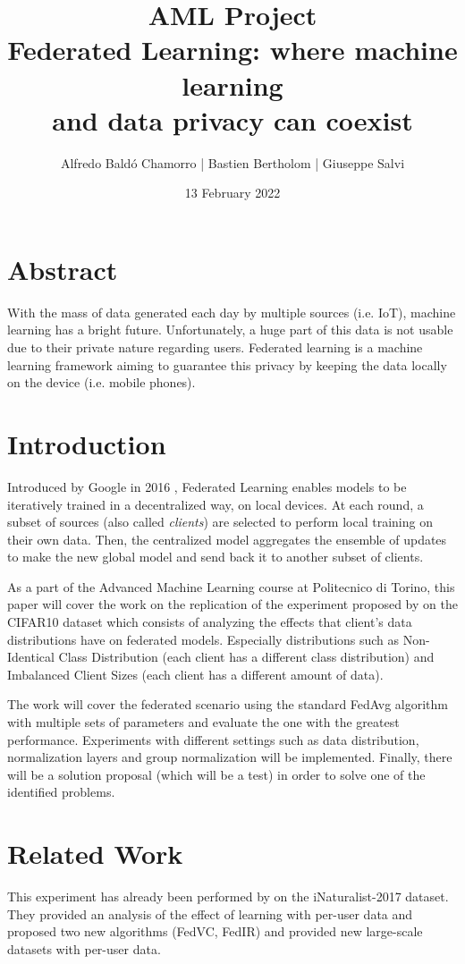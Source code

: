 \documentclass[twocolumn]{article}
\title{\textbf{AML Project}
\\Federated Learning: where machine learning \\and data privacy can coexist
}
\author{
Alfredo Baldó Chamorro | 
Bastien Bertholom |
Giuseppe Salvi
}
\date{13 February 2022}
\begin{document}
\maketitle

\section{Abstract}
With the mass of data generated each day by multiple sources (i.e. IoT), machine learning has a bright future. Unfortunately, a huge part of this data is not usable due to their private nature regarding users. Federated learning is a machine learning framework aiming to guarantee this privacy by keeping the data locally on the device (i.e. mobile phones).
\section{Introduction} %

Introduced by Google in 2016 \cite{DBLP:journals/corr/KonecnyMYRSB16}, Federated Learning enables models to be iteratively trained in a decentralized way, on local devices. At each round, a subset of sources (also called \emph{clients}) are selected to perform local training on their own data. Then, the centralized model aggregates the ensemble of updates to make the new global model and send back it to another subset of clients. 

As a part of the Advanced Machine Learning course at Politecnico di Torino, this paper will cover the work on the replication of the experiment proposed by \cite{DBLP:journals/corr/abs-2003-08082} on the CIFAR10 dataset which consists of analyzing the effects that client's data distributions have on federated models. Especially distributions such as Non-Identical Class Distribution (each client has a different class distribution) and Imbalanced Client Sizes (each client has a different amount of data). 

The work will cover the federated scenario using the standard FedAvg algorithm with multiple sets of parameters and evaluate the one with the greatest performance. Experiments with different settings such as data distribution, normalization layers and group normalization will be implemented. Finally, there will be a solution proposal (which will be a test) in order to solve one of the identified problems.

\section{Related Work} %
This experiment has already been performed by \cite{DBLP:journals/corr/abs-2003-08082}  on the iNaturalist-2017 dataset. They provided an analysis of the effect of learning with per-user data and proposed two new algorithms (FedVC, FedIR) and provided new large-scale datasets with per-user data.
\end{document}
